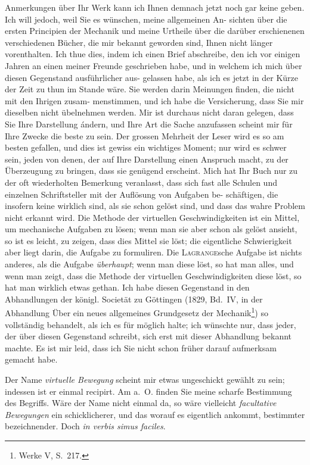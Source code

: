 \documentclass[12pt,a4paper]{article}
\theoremstyle{plain}
\theoremstyle{definition}
\theoremstyle{remark}
\begin{document}
Anmerkungen \"uber Ihr Werk kann ich Ihnen demnach jetzt noch gar
keine geben. Ich will jedoch, weil Sie es w\"unschen, meine allgemeinen An-
sichten \"uber die ersten Principien der Mechanik und meine Urtheile \"uber
die dar\"uber erschienenen verschiedenen B\"ucher, die mir bekannt geworden
sind, Ihnen nicht l\"anger vorenthalten. Ich thue dies, indem ich einen Brief
abschreibe, den ich vor einigen Jahren an einen meiner Freunde geschrieben
habe, und in welchem ich mich \"uber diesen Gegenstand ausf\"uhrlicher aus-
gelassen habe, als ich es jetzt in der K\"urze der Zeit zu thun im Stande
w\"are. Sie werden darin Meinungen finden, die nicht mit den Ihrigen zusam-
menstimmen, und ich habe die Versicherung, dass Sie mir dieselben nicht
\"ubelnehmen werden. Mir ist durchaus nicht daran gelegen, dass Sie Ihre
Darstellung \'andern, und Ihre Art die Sache anzufassen scheint mir f\"ur
Ihre Zwecke die beste zu sein. Der grossen Mehrheit der Leser wird es so
am besten gefallen, und dies ist gewiss ein wichtiges Moment; nur wird es
schwer sein, jeden von denen, der auf Ihre Darstellung einen Anspruch macht,
zu der \"Uberzeugung zu bringen, dass sie gen\"ugend erscheint. Mich hat Ihr
Buch nur zu der oft wiederholten Bemerkung veranlasst, dass sich fast alle
Schulen und einzelnen Schriftsteller mit der Aufl\"osung von Aufgaben be-
sch\"aftigen, die insofern keine wirklich sind, als sie schon gel\"ost sind, und
dass das wahre Problem nicht erkannt wird. Die Methode der virtuellen
Geschwindigkeiten ist ein Mittel, um mechanische Aufgaben zu l\"osen; wenn
man sie aber schon als gel\"ost ansieht, so ist es leicht, zu zeigen, dass dies
Mittel sie l\"ost; die eigentliche Schwierigkeit aber liegt darin, die Aufgabe
zu formuliren. Die \textsc{Lagrange}sche Aufgabe ist nichts anderes, als die Aufgabe
\textit{\"uberhaupt}; wenn man diese l\"ost, so hat man alles, und wenn man zeigt, dass
die Methode der virtuellen Geschwindigkeiten diese l\"ost, so hat man wirklich
etwas gethan. Ich habe diesen Gegenstand in den Abhandlungen der k\"onigl.
Societ\"at zu G\"ottingen (1829, Bd.~IV, in der Abhandlung \"Uber ein neues
allgemeines Grundgesetz der Mechanik\footnote{Werke V, S.~217.}) so vollst\"andig
behandelt, als ich es f\"ur m\"oglich halte; ich w\"unschte nur, dass jeder, der
\"uber diesen Gegenstand schreibt, sich erst mit dieser Abhandlung bekannt
machte. Es ist mir leid, dass ich Sie nicht schon fr\"uher darauf aufmerksam
 gemacht habe.

Der Name \textit{virtuelle Bewegung} scheint mir etwas ungeschickt gew\"ahlt
zu sein; indessen ist er einmal recipirt. Am a.~O. finden Sie meine scharfe
Bestimmung des Begriffs. W\"are der Name nicht einmal da, so w\"are vielleicht
\textit{facultative Bewegungen} ein schicklicherer, und das worauf es eigentlich
ankommt, bestimmter bezeichnender. Doch \textit{in verbis simus faciles}.
\end{document}
